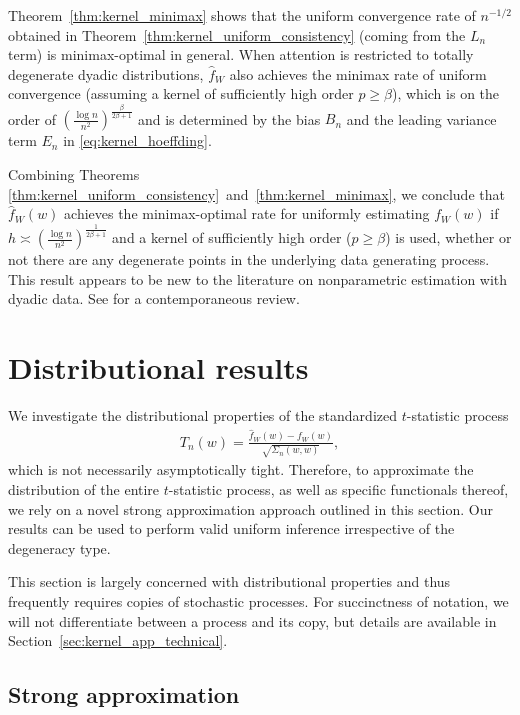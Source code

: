 \documentclass[11pt,lof]{puthesis}
\theoremstyle{break}
\theoremstyle{proof}
\begin{document}
Theorem~\ref{thm:kernel_minimax} shows that the uniform convergence rate of
$n^{-1/2}$ obtained in Theorem~\ref{thm:kernel_uniform_consistency}
(coming from the $L_n$ term) is minimax-optimal in general.
When attention is restricted to totally degenerate dyadic distributions,
$\hat f_W$ also achieves the minimax rate of uniform convergence
(assuming a kernel of sufficiently high order $p \geq \beta$),
which is on the order of
$\left(\frac{\log n}{n^2}\right)^{\frac{\beta}{2\beta+1}}$ and
is determined by the bias $B_n$ and the leading variance term $E_n$ in
\eqref{eq:kernel_hoeffding}.

Combining Theorems
\ref{thm:kernel_uniform_consistency}~and~\ref{thm:kernel_minimax},
we conclude that $\hat{f}_W(w)$ achieves the minimax-optimal rate for uniformly
estimating $f_W(w)$ if $h \asymp \left( \frac{\log n}{n^2}
\right)^{\frac{1}{2\beta+1}}$ and a kernel of sufficiently high order
($p \geq \beta$) is used, whether or not there are any degenerate points in the
underlying data generating process. This result appears to be new to the
literature on nonparametric estimation with dyadic data. See
\citet{gao2021minimax} for a contemporaneous review.

\section{Distributional results}
\label{sec:kernel_inference}

We investigate the distributional properties of the
standardized $t$-statistic process
%
\begin{align*}
T_n(w) = \frac{\hat{f}_W(w) - f_W(w)}{\sqrt{\Sigma_n(w,w)}},
\end{align*}
%
which is not necessarily asymptotically tight. Therefore, to approximate the
distribution of the entire $t$-statistic process, as well as specific
functionals thereof, we rely on a novel strong approximation approach outlined
in this section. Our results can be used to perform valid uniform inference
irrespective of the degeneracy type.

This section is largely concerned with distributional properties and thus
frequently requires copies of stochastic processes. For succinctness of
notation, we will not differentiate between a process and its copy, but details
are available in Section~\ref{sec:kernel_app_technical}.

\subsection{Strong approximation}
\end{document}
